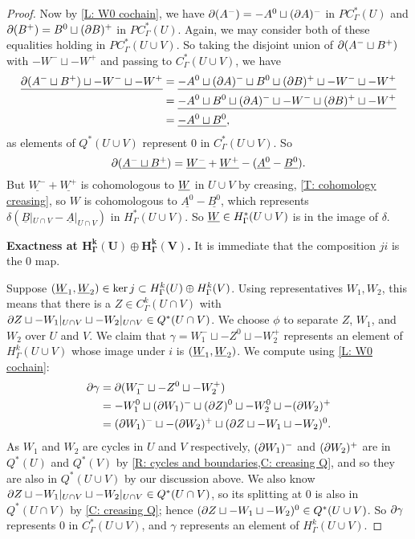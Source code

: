 \begin{proof}
	Now by \cref{L: W0 cochain}, we have $\partial(A^-) = -A^0 \sqcup (\partial A)^-$ in $PC^*_\Gamma(U)$ and $\partial (B^+) = B^0 \sqcup (\partial B)^+$ in $PC^*_\Gamma(U)$.
	Again, we may consider both of these equalities holding in $PC^*_\Gamma(U \cup V)$.
	So taking the disjoint union of $\partial(A^- \sqcup B^+)$ with $- W^- \sqcup - W^+$ and passing to $C^*_\Gamma(U \cup V)$, we have
	\begin{align*}
		\underline{	\partial(A^- \sqcup B^+) \sqcup - W^- \sqcup - W^+} &= \underline{-A^0 \sqcup (\partial A)^- \sqcup B^0 \sqcup (\partial B)^+ \sqcup - W^- \sqcup - W^+ }\\
		&= \underline{-A^0 \sqcup B^0 \sqcup (\partial A)^- \sqcup - W^- \sqcup (\partial B)^+ \sqcup - W^+ }\\
		&= \underline{-A^0 \sqcup B^0},
	\end{align*}
	as elements of $Q^*(U \cup V)$ represent $0$ in $C^*_\Gamma(U \cup V)$.
	So
		\[	\partial (\underline{A^- \sqcup B^+}) = \underline{W^-} + \underline{W^+} -(\underline{A^0}-\underline{B^0}).\]
	But $\underline{W^-} + \underline{W^+}$ is cohomologous to $\underline{W}$ in $U \cup V$ by creasing, \cref{T: cohomology creasing}, so $W$ is cohomologous to $\underline{A^0}-\underline{B^0}$, which represents $\delta(\underline{B}|_{U \cap V}-\underline{A}|_{U \cap V})$ in $H^*_\Gamma(U \cup V)$.
	So $\underline{W} \in H^*_\Gamma(U \cup V)$ is in the image of $\delta$.

	\textbf{Exactness at $\mathbf{H^k_\Gamma(U) \oplus H^k_\Gamma(V)}$.}
	It is immediate that the composition $ji$ is the $0$ map.

	Suppose $(\underline{W}_1,\underline{W}_2) \in \ker j \subset H^k_\Gamma(U) \oplus H^k_\Gamma(V)$.
	Using representatives $W_1,W_2$, this means that there is a $Z \in C^k_\Gamma(U \cap V)$ with $\partial Z \sqcup - W_1|_{U \cap V} \sqcup - W_2|_{U \cap V} \in Q^*(U \cap V)$.
	We choose $\phi$ to separate $Z$, $W_1$, and $W_2$ over $U$ and $V$.
	We claim that $\gamma = W_1^- \sqcup -Z^0 \sqcup -W_2^+$ represents an element of $H^k_\Gamma(U \cup V)$ whose image under $i$ is $(\underline{W}_1,\underline{W}_2)$.
	We compute using \cref{L: W0 cochain}:
	\begin{align*}
	\partial \gamma& = \partial (W_1^- \sqcup - Z^0 \sqcup -W_2^+)\\
		& = -W_1^0 \sqcup (\partial W_1)^- \sqcup (\partial Z)^0 \sqcup - W_2^0 \sqcup - (\partial W_2)^+\\
		& = (\partial W_1)^- \sqcup - (\partial W_2)^+ \sqcup (\partial Z \sqcup -W_1 \sqcup - W_2)^0.
	\end{align*}
	As $W_1$ and $W_2$ are cycles in $U$ and $V$ respectively, $(\partial W_1)^-$ and $(\partial W_2)^+$ are in $Q^*(U)$ and $Q^*(V)$ by \cref{R: cycles and boundaries,C: creasing Q}, and so they are also in $Q^*(U \cup V)$ by our discussion above.
	We also know $\partial Z \sqcup - W_1|_{U \cap V} \sqcup - W_2|_{U \cap V} \in Q^*(U \cap V)$, so its splitting at $0$ is also in $Q^*(U \cap V)$ by \cref{C: creasing Q}; hence $(\partial Z \sqcup -W_1 \sqcup - W_2)^0 \in Q^*(U \cup V)$.
	So $\partial \gamma$ represents $0$ in $C^*_\Gamma(U \cup V)$, and $\gamma$ represents an element of $H^k_\Gamma(U \cup V)$.


\end{proof}
